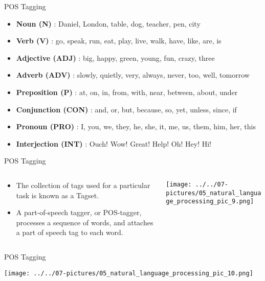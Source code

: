 \documentclass[11pt]{beamer}
\begin{document}
\begin{frame}{POS Tagging}
	\begin{itemize}
		\item \textbf{Noun (N)} : Daniel, London, table, dog, teacher, pen, city
		\item \textbf{ Verb (V)} : go, speak, run, eat, play, live, walk, have, like, are, is
		\item \textbf{ Adjective (ADJ)} : big, happy, green, young, fun, crazy, three
		\item  \textbf{ Adverb (ADV)} : slowly, quietly, very, always, never, too, well, tomorrow
		\item \textbf{ Preposition (P)} : at, on, in, from, with, near, between, about, under
		\item \textbf{ Conjunction (CON)} : and, or, but, because, so, yet, unless, since, if
		\item \textbf{ Pronoun (PRO)} : I, you, we, they, he, she, it, me, us, them, him, her, this
		\item \textbf{ Interjection (INT)} : Ouch! Wow! Great! Help! Oh! Hey! Hi!
	\end{itemize}
\end{frame}
\begin{frame}{POS Tagging}
\begin{columns}[T] %
\begin{column}{.48\textwidth}
        \begin{itemize}
		\item The collection of tags used for a particular task is known as a Tagset.
		\item A part-of-speech tagger, or POS-tagger, processes a sequence of words, and attaches a part of speech tag to each word.
        \end{itemize}
\end{column}%
\hfill%
\begin{column}{.48\textwidth}
        \texttt{[image: ../../07-pictures/05\_natural\_language\_processing\_pic\_9.png]}
\end{column}%
\end{columns}
\end{frame}
\begin{frame}{POS Tagging}
	\begin{center}
	\texttt{[image: ../../07-pictures/05\_natural\_language\_processing\_pic\_10.png]}
	\end{center}
\end{frame}
\end{document}
